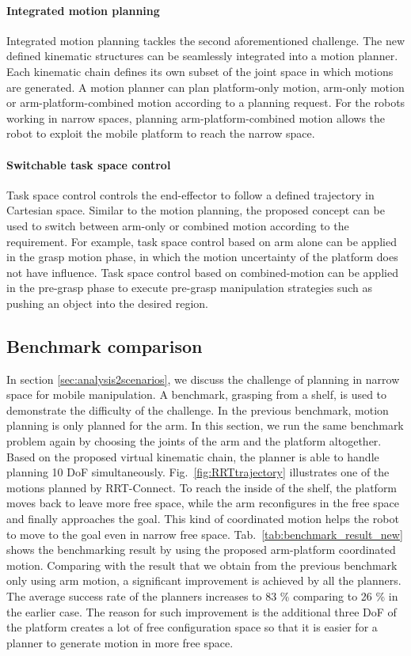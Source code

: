 \paragraph{Integrated motion planning}
Integrated motion planning tackles the second aforementioned challenge. The new defined kinematic structures can be seamlessly integrated into a motion planner. Each kinematic chain defines its own subset of the joint space in which motions are generated. A motion planner can plan platform-only motion, arm-only motion or arm-platform-combined motion according to a planning request. For the robots working in narrow spaces, planning arm-platform-combined motion allows the robot to exploit the mobile platform to reach the narrow space. 


\paragraph{Switchable task space control}
Task space control controls the end-effector to follow a defined trajectory in Cartesian space. Similar to the motion planning, the proposed concept can be used to switch between arm-only or combined motion according to the requirement. For example, task space control based on arm alone can be applied in the grasp motion phase, in which the motion uncertainty of the platform does not have influence. Task space control based on combined-motion can be applied in the pre-grasp phase to execute pre-grasp manipulation strategies such as pushing an object into the desired region.

\subsection{Benchmark comparison}
In section \ref{sec:analysis2scenarios}, we discuss the challenge of planning in narrow space for mobile manipulation. A benchmark, grasping from a shelf, is used to demonstrate the difficulty of the challenge. In the previous benchmark, motion planning is only planned for the arm. In this section, we run the same benchmark problem again by choosing the joints of the arm and the platform altogether. Based on the proposed virtual kinematic chain, the planner is able to handle planning 10 DoF simultaneously. Fig.~\ref{fig:RRTtrajectory} illustrates one of the motions planned by RRT-Connect. To reach the inside of the shelf, the platform moves back to leave more free space, while the arm reconfigures in the free space and finally approaches the goal. This kind of coordinated motion helps the robot to move to the goal even in narrow free space. Tab.~\ref{tab:benchmark_result_new} shows the benchmarking result by using the proposed arm-platform coordinated motion. Comparing with the result that we obtain from the previous benchmark  only using arm motion, a significant improvement is achieved by all the planners. The average success rate of the planners  increases to 83 \% comparing to 26 \% in the earlier case. The reason for such improvement is the additional three DoF of the platform creates a lot of free configuration space so that it is easier for a planner to generate motion in more free space.  

